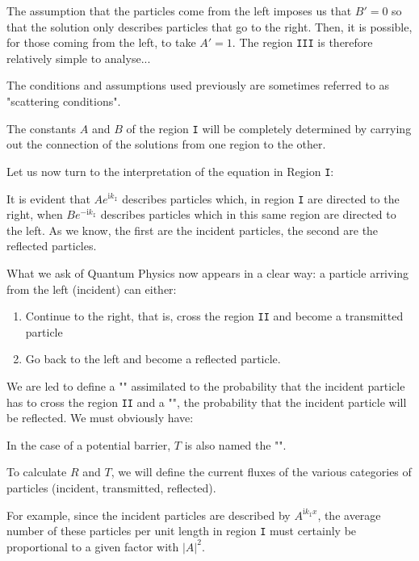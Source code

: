 	The assumption that the particles come from the left imposes us that $B'=0$ so that the solution only describes particles that go to the right. Then, it is possible, for those coming from the left, to take $A'=1$. The region \texttt{III} is therefore relatively simple to analyse...
	
	\begin{tcolorbox}[title=Remark,colframe=black,arc=10pt]
	The conditions and assumptions used previously are sometimes referred to as "scattering conditions".
	\end{tcolorbox}
	The constants $A$ and $B$ of the region \texttt{I} will be completely determined by carrying out the connection of the solutions from one region to the other.

	Let us now turn to the interpretation of the equation in Region \texttt{I}:
	
	It is evident that $Ae^{\mathrm{i}k_{\texttt{I}}}$ describes particles which, in region \texttt{I} are directed to the right, when $Be^{-\mathrm{i}k_{\texttt{I}}}$ describes particles which in this same region are directed to the left. As we know, the first are the incident particles, the second are the reflected particles.
	
	What we ask of Quantum Physics now appears in a clear way: a particle arriving from the left (incident) can either:
	\begin{enumerate}
		\item Continue to the right, that is, cross the region \texttt{II} and become a transmitted particle

		\item Go back to the left and become a reflected particle.
	\end{enumerate}
	We are led to define a ""  assimilated to the probability that the incident particle has to cross the region \texttt{II} and a "", the probability that the incident particle will be reflected. We must obviously have:
	
	In the case of a potential barrier, $T$ is also named the "".

	To calculate $R$ and $T$, we will define the current fluxes of the various categories of particles (incident, transmitted, reflected).
	
	For example, since the incident particles are described by $A^{\mathrm{i}k_\texttt{I}x}$, the average number of these particles per unit length in region \texttt{I} must certainly be proportional to a given factor with $|A|^2$.
	
